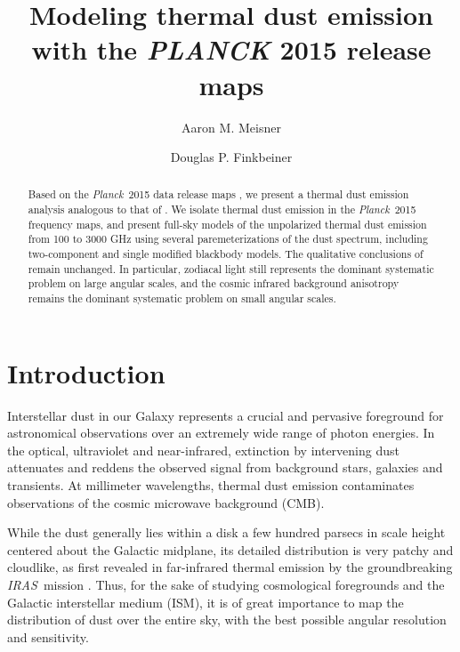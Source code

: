 \documentclass{emulateapj}
\newcommand{\IRAS}{{\it IRAS}}
\newcommand{\PLANCK}{{\it Planck}}
\begin{document}
\title{Modeling thermal dust emission with the {\it PLANCK} 2015 release maps}
\author{Aaron M. Meisner}
\author{Douglas P. Finkbeiner}

\begin{abstract}

Based on the \PLANCK~2015 data release maps \citep{planck2015}, we present a 
thermal dust emission analysis analogous to that of \cite{meisner15}. We 
isolate thermal dust emission in the \PLANCK~2015 frequency maps, and present 
full-sky models of the unpolarized thermal dust emission from 100 to 3000 GHz
using several paremeterizations of the dust spectrum, including two-component 
and single modified blackbody models. The qualitative conclusions of 
\cite{meisner15} remain unchanged. In particular, zodiacal light still 
represents the dominant systematic problem on large angular scales, and the 
cosmic infrared background anisotropy remains the dominant systematic problem 
on small angular scales.


\end{abstract}


\section{Introduction}
Interstellar dust in our Galaxy represents a crucial and pervasive foreground
for astronomical observations over an extremely wide range of photon energies.
In the optical, ultraviolet and near-infrared, extinction by intervening dust
attenuates and reddens the observed signal from background stars, galaxies and
transients. At millimeter wavelengths, thermal dust emission contaminates
observations of the cosmic microwave background (CMB).

While the dust generally lies within a disk a few hundred parsecs in scale 
height centered about the Galactic midplane, its detailed distribution is very 
patchy and cloudlike, as first revealed in far-infrared thermal emission by the
groundbreaking \IRAS~mission \citep{low84, wheelock94}. Thus, for the sake of 
studying cosmological foregrounds and the Galactic interstellar medium (ISM), 
it is of great importance to map the distribution of dust over the entire sky, 
with the best possible angular resolution and sensitivity.
\end{document}
